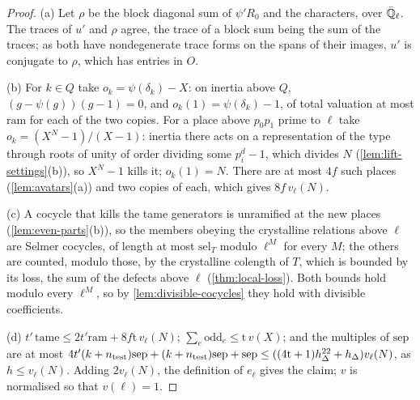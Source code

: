 \begin{proof}
(a) Let $\rho$ be the block diagonal sum of $\psi'R_0$ and the characters, over $\bar{\mathbb{Q}}_\ell$. The traces of $u'$ and $\rho$ agree, the trace of a block sum being the sum of the traces; as both have nondegenerate trace forms on the spans of
their images, $u'$ is conjugate to $\rho$, which has entries in $O$.

(b) For $k\in Q$ take $o_k=\psi(\delta_k)-X$: on inertia above $Q$, $(g-\psi(g))(g-1)=0$, and $o_k(1)=\psi(\delta_k)-1$, of total valuation at most $\mathrm{ram}$ for each of the two copies. For a place above $p_0p_1$ prime to $\ell$ take
$o_k=(X^N-1)/(X-1)$: inertia there acts on a representation of the type through roots of unity of order dividing some $p_i^d-1$, which divides $N$ (\cref{lem:lift-settings}(b)), so $X^N-1$ kills it; $o_k(1)=N$. There are at most $4f$ such
places (\cref{lem:avatars}(a)) and two copies of each, which gives $8f\,v_\ell(N)$.

(c) A cocycle that kills the tame generators is unramified at the new places (\cref{lem:even-parts}(b)), so the members obeying the crystalline relations above $\ell$ are Selmer cocycles, of length at most $\mathrm{sel}_T$ modulo $\ell^M$ for every
$M$; the others are counted, modulo those, by the crystalline colength of $T$, which is bounded by its loss, the sum of the defects above $\ell$ (\cref{thm:local-loss}). Both bounds hold modulo every $\ell^M$, so by \cref{lem:divisible-cocycles} they hold
with divisible coefficients.

(d) $t'\,\mathrm{tame}\le2t'\mathrm{ram}+8f\mathrm t\,v_\ell(N)$; $\sum_e\mathrm{odd}_e\le\mathrm t\,v(X)$; and the multiples of $\mathrm{sep}$ are at most $4t'(k+n_{\rm test})\mathrm{sep}+(k+n_{\rm test})\mathrm{sep}+\mathrm{sep}\le((4\mathrm t+1)h_\Delta^{22}+h_\Delta)v_\ell(N)$, as $h\le v_\ell(N)$. Adding $2v_\ell(N)$,
the definition of $e_\ell$ gives the claim; $v$ is normalised so that $v(\ell)=1$.
\end{proof}

